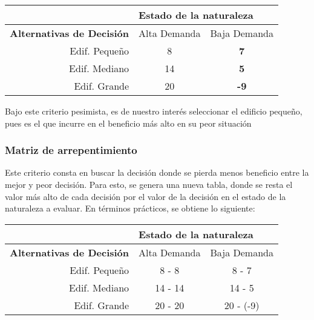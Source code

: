 \begin{table}[H]
    \begin{tabular}{r|cc|}
        \cline{2-3}
        \multicolumn{1}{l|}{}                                   & \multicolumn{2}{l|}{\textbf{Estado de la naturaleza}}                                     \\ \hline
        \multicolumn{1}{|l|}{\textbf{Alternativas de Decisión}} & \multicolumn{1}{l|}{Alta Demanda}                     & \multicolumn{1}{l|}{Baja Demanda} \\ \hline
        \multicolumn{1}{|r|}{Edif. Pequeño}                     & \multicolumn{1}{c|}{8}                                & {\color[HTML]{FE0000} \textbf{7}} \\
        \multicolumn{1}{|r|}{Edif. Mediano}                     & \multicolumn{1}{c|}{14}                               & \textbf{5}                        \\
        \multicolumn{1}{|r|}{Edif. Grande}                      & \multicolumn{1}{c|}{{\color[HTML]{333333} 20}}        & \textbf{-9}                       \\ \hline
    \end{tabular}
\end{table}

Bajo este criterio pesimista, es de nuestro interés seleccionar el edificio pequeño, pues es el que incurre en el beneficio más alto en su peor situación

\subsubsection{Matriz de arrepentimiento}
Este criterio consta en buscar la decisión donde se pierda menos beneficio entre la mejor y peor decisión. Para esto, se genera una nueva tabla, donde se resta el valor más alto de cada decisión por el valor de la decisión en el estado de la naturaleza a evaluar. En términos prácticos, se obtiene lo siguiente:

\begin{table}[H]
    \begin{tabular}{r|cc|}
        \cline{2-3}
        \multicolumn{1}{l|}{}                                   & \multicolumn{2}{l|}{\textbf{Estado de la naturaleza}}                                     \\ \hline
        \multicolumn{1}{|l|}{\textbf{Alternativas de Decisión}} & \multicolumn{1}{l|}{Alta Demanda}                     & \multicolumn{1}{l|}{Baja Demanda} \\ \hline
        \multicolumn{1}{|r|}{Edif. Pequeño}                     & \multicolumn{1}{c|}{8 - 8}                            & {\color[HTML]{333333} 8 - 7}      \\
        \multicolumn{1}{|r|}{Edif. Mediano}                     & \multicolumn{1}{c|}{14 - 14}                          & 14 - 5                            \\
        \multicolumn{1}{|r|}{Edif. Grande}                      & \multicolumn{1}{c|}{{\color[HTML]{333333} 20 - 20}}   & 20 - (-9)                         \\ \hline
    \end{tabular}
\end{table}

